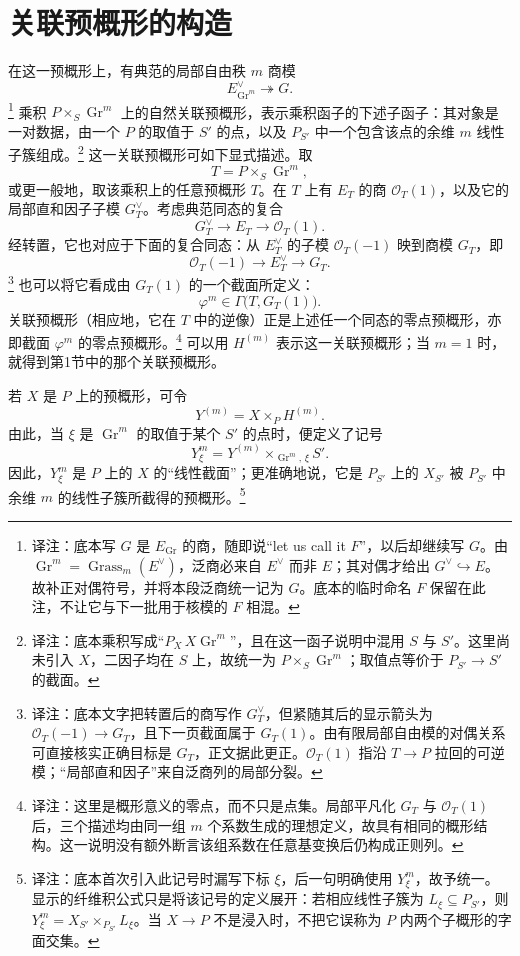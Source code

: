 \documentclass[openany,fontset=fandol]{ctexbook}
\newcommand{\note}[1]{\footnote{译注：#1}}
\begin{document}
\section*{关联预概形的构造}
在这一预概形上，有典范的局部自由秩 $m$ 商模
\[
E^\vee_{\operatorname{Gr}^{m}}\twoheadrightarrow G.
\]
\note{底本写 $G$ 是 $E_{\operatorname{Gr}}$ 的商，随即说“let us call it $F$”，以后却继续写 $G$。由 $\operatorname{Gr}^m=\operatorname{Grass}_m(E^\vee)$，泛商必来自 $E^\vee$ 而非 $E$；其对偶才给出 $G^\vee\hookrightarrow E$。故补正对偶符号，并将本段泛商统一记为 $G$。底本的临时命名 $F$ 保留在此注，不让它与下一批用于核模的 $F$ 相混。}
乘积 $P\times_S\operatorname{Gr}^{m}$ 上的自然关联预概形，表示乘积函子的下述子函子：其对象是一对数据，由一个 $P$ 的取值于 $S'$ 的点，以及 $P_{S'}$ 中一个包含该点的余维 $m$ 线性子簇组成。\note{底本乘积写成“$P_X\,X\operatorname{Gr}^m$”，且在这一函子说明中混用 $S$ 与 $S'$。这里尚未引入 $X$，二因子均在 $S$ 上，故统一为 $P\times_S\operatorname{Gr}^m$；取值点等价于 $P_{S'}\to S'$ 的截面。}
这一关联预概形可如下显式描述。取
\[
T=P\times_S\operatorname{Gr}^{m},
\]
或更一般地，取该乘积上的任意预概形 $T$。在 $T$ 上有 $E_T$ 的商 $\mathcal O_T(1)$，以及它的局部直和因子子模 $G_T^\vee$。考虑典范同态的复合
\[
G_T^\vee\longrightarrow E_T\longrightarrow\mathcal O_T(1).
\]
经转置，它也对应于下面的复合同态：从 $E_T^\vee$ 的子模 $\mathcal O_T(-1)$ 映到商模 $G_T$，即
\[
\mathcal O_T(-1)\longrightarrow E_T^\vee\longrightarrow G_T.
\]
\note{底本文字把转置后的商写作 $G_T^\vee$，但紧随其后的显示箭头为 $\mathcal O_T(-1)\to G_T$，且下一页截面属于 $G_T(1)$。由有限局部自由模的对偶关系可直接核实正确目标是 $G_T$，正文据此更正。$\mathcal O_T(1)$ 指沿 $T\to P$ 拉回的可逆模；“局部直和因子”来自泛商列的局部分裂。}
也可以将它看成由 $G_T(1)$ 的一个截面所定义：
\[
\varphi^m\in\Gamma\bigl(T,G_T(1)\bigr).
\]
关联预概形（相应地，它在 $T$ 中的逆像）正是上述任一个同态的零点预概形，亦即截面 $\varphi^m$ 的零点预概形。\note{这里是概形意义的零点，而不只是点集。局部平凡化 $G_T$ 与 $\mathcal O_T(1)$ 后，三个描述均由同一组 $m$ 个系数生成的理想定义，故具有相同的概形结构。这一说明没有额外断言该组系数在任意基变换后仍构成正则列。}
可以用 $H^{(m)}$ 表示这一关联预概形；当 $m=1$ 时，就得到第1节中的那个关联预概形。

若 $X$ 是 $P$ 上的预概形，可令
\[
Y^{(m)}=X\times_P H^{(m)}.
\]
由此，当 $\xi$ 是 $\operatorname{Gr}^{m}$ 的取值于某个 $S'$ 的点时，便定义了记号
\[
Y^m_\xi=Y^{(m)}\times_{\operatorname{Gr}^{m},\,\xi}S'.
\]
因此，$Y^m_\xi$ 是 $P$ 上的 $X$ 的“线性截面”；更准确地说，它是 $P_{S'}$ 上的 $X_{S'}$ 被 $P_{S'}$ 中余维 $m$ 的线性子簇所截得的预概形。\note{底本首次引入此记号时漏写下标 $\xi$，后一句明确使用 $Y^m_\xi$，故予统一。显示的纤维积公式只是将该记号的定义展开：若相应线性子簇为 $L_\xi\subseteq P_{S'}$，则 $Y^m_\xi=X_{S'}\times_{P_{S'}}L_\xi$。当 $X\to P$ 不是浸入时，不把它误称为 $P$ 内两个子概形的字面交集。}
\end{document}
